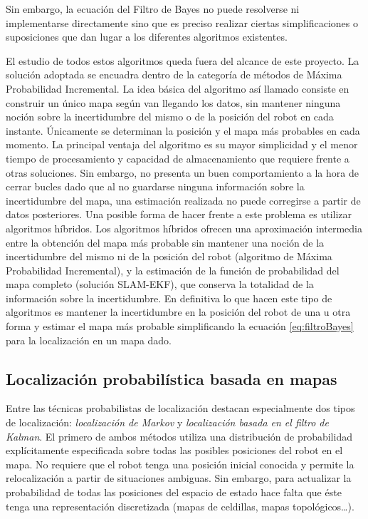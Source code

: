 Sin embargo, la ecuación del Filtro de Bayes no puede resolverse ni implementarse directamente sino que es preciso realizar ciertas simplificaciones o suposiciones que dan lugar a los diferentes algoritmos existentes.

El estudio de todos estos algoritmos queda fuera del alcance de este proyecto. La solución adoptada se encuadra dentro de la categoría de métodos de Máxima Probabilidad Incremental. La idea básica del algoritmo así llamado consiste en construir un único mapa según van llegando los datos, sin mantener ninguna noción sobre la incertidumbre del mismo o de la posición del robot en cada instante. Únicamente se determinan la posición y el mapa más probables en cada momento. La principal ventaja del algoritmo es su mayor simplicidad y el menor tiempo de procesamiento y capacidad de almacenamiento que requiere frente a otras soluciones. Sin embargo, no presenta un buen comportamiento a la hora de cerrar bucles dado que al no guardarse ninguna información sobre la incertidumbre del mapa, una estimación realizada no puede corregirse a partir de datos posteriores. Una posible forma de hacer frente a este problema es utilizar algoritmos híbridos. Los algoritmos híbridos ofrecen una aproximación intermedia entre la obtención del mapa más probable sin mantener una noción de la incertidumbre del mismo ni de la posición del robot (algoritmo de Máxima Probabilidad Incremental), y la estimación de la función de probabilidad del mapa completo (solución SLAM-EKF), que conserva la totalidad de la información sobre la incertidumbre. En definitiva lo que hacen este tipo de algoritmos es mantener la incertidumbre en la posición del robot de una u otra forma y estimar el mapa más probable simplificando la ecuación \ref{eq:filtroBayes} para la localización en un mapa dado.



\subsection {Localización probabilística basada en mapas}

Entre las técnicas probabilistas de localización destacan especialmente dos tipos de localización: \emph{localización de Markov} y \emph{localización basada en el filtro de Kalman}. El primero de ambos métodos utiliza una distribución de probabilidad explícitamente especificada sobre todas las posibles posiciones del robot en el mapa. No requiere que el robot tenga una posición inicial conocida y permite la relocalización a partir de situaciones ambiguas. Sin embargo, para actualizar la probabilidad de todas las posiciones del espacio de estado hace falta que éste tenga una representación discretizada (mapas de celdillas, mapas topológicos\ldots).

